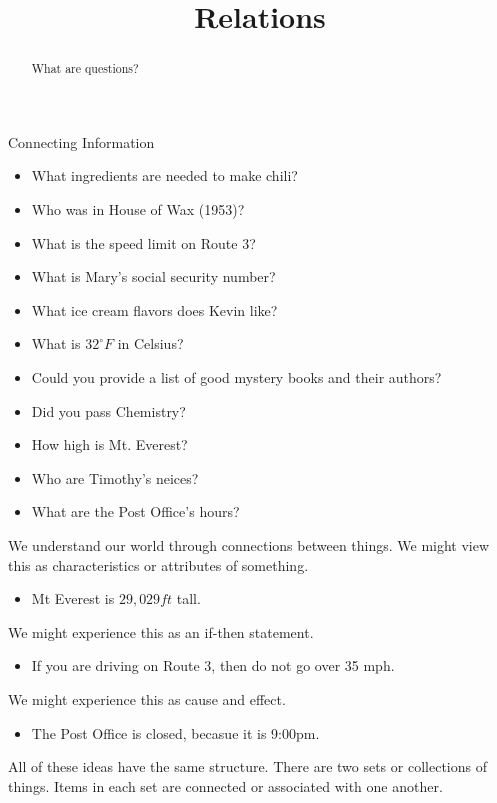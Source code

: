 \documentclass{ximera}
\title{Relations}
\begin{document}
\begin{abstract}
What are questions?
\end{abstract}
\maketitle

\begin{observation} Connecting Information

\begin{itemize} 
\item What ingredients are needed to make chili?
\item Who was in House of Wax (1953)?
\item What is the speed limit on Route 3?
\item What is Mary's social security number?
\item What ice cream flavors does Kevin like?
\item What is $32^\circ F$ in Celsius?
\item Could you provide a list of good mystery books and their authors?
\item Did you pass Chemistry?
\item How high is Mt. Everest?
\item Who are Timothy's neices?
\item What are the Post Office's hours?
\end{itemize}

We understand our world through connections between things. We might view this as characteristics or attributes of something. 
\begin{itemize}
\item Mt Everest is $29,029 ft$ tall.
\end{itemize}


We might experience this as an if-then statement.
\begin{itemize}
\item If you are driving on Route 3, then do not go over 35 mph.
\end{itemize}



We might experience this as cause and effect.
\begin{itemize}
\item The Post Office is closed, becasue it is 9:00pm.
\end{itemize}



All of these ideas have the same structure.  There are two sets or collections of things.  Items in each set are connected or associated with one another.




\end{observation}
\end{document}
